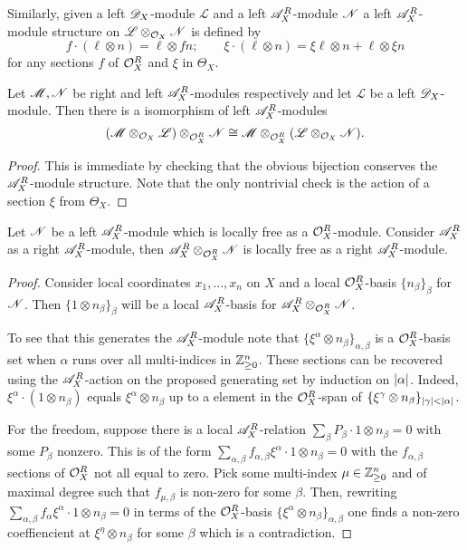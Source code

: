 Similarly, given a left $\mathscr{D}_X$-module $\mathscr{L}$ and a left $\mathscr{A}_X^R$-module $\mathscr{N}$ a left $\mathscr{A}_X^R$-module structure on $\mathscr{L} \otimes_{\mathcal{O}_X} \mathscr{N}$ is defined by
$$f \cdot (\ell\otimes n) =\ell \otimes fn; \qquad \xi \cdot (\ell\otimes n ) = \xi \ell \otimes n + \ell \otimes \xi n$$
for any sections $f$ of $\mathcal{O}_X^R$ and $\xi$ in $\Theta_X$.

\begin{lemma}\label{lem: IsomorphismTensors}
  Let $\mathscr{M}, \mathscr{N}$ be right and left $\mathscr{A}_X^R$-modules respectively and let $\mathscr{L}$ be a left $\mathscr{D}_X$-module. Then there is a isomorphism of left $\mathscr{A}_X^R$-modules
  $$(\mathscr{M} \otimes_{\mathcal{O}_X} \mathscr{L})\otimes_{\mathcal{O}_X^R} \mathscr{N} \cong \mathscr{M} \otimes_{\mathcal{O}_X^R} (\mathscr{L}\otimes_{\mathcal{O}_X} \mathscr{N}).   $$
\end{lemma}
\begin{proof}
  This is immediate by checking that the obvious bijection conserves the $\mathscr{A}_X^R$-module structure. Note that the only nontrivial check is the action of a section $\xi$ from $\Theta_X$.
\end{proof}
\begin{lemma}\label{lem: FreeLeftAModuleTensor}
  Let $\mathscr{N}$ be a left $\mathscr{A}_X^R$-module which is locally free as a $\mathcal{O}_X^R$-module. Consider $\mathscr{A}_X^R$ as a right $\mathscr{A}_X^R$-module, then $\mathscr{A}_X^R \otimes_{\mathcal{O}_X^R} \mathscr{N}$ is locally free as a right $\mathscr{A}_X^R$-module.
\end{lemma}
\begin{proof}
  Consider local coordinates $x_1,\ldots, x_n$ on $X$ and a local $\mathcal{O}_X^R$-basis $\{n_\beta\}_\beta$ for $\mathscr{N}$. Then $\{1\otimes n_\beta\}_{\beta}$ will be a local $\mathscr{A}_X^R$-basis for $\mathscr{A}_X^R \otimes_{\mathcal{O}_X^R} \mathscr{N}$.

  To see that this generates the $\mathscr{A}_X^R$-module note that $\{\xi^\alpha \otimes n_\beta\}_{\alpha,\beta}$
  is a $\mathcal{O}_X^R$-basis set when $\alpha$ runs over all multi-indices in $\mathbb{Z}_{\geq 0}^n$.
  These sections can be recovered using the $\mathscr{A}_X^R$-action on the proposed generating set by induction on $\vert \alpha \vert$.
  Indeed, $\xi^\alpha \cdot (1 \otimes n_\beta)$ equals $\xi^\alpha \otimes n_\beta$ up to a element in the $\mathcal{O}_X^R$-span of $\{\xi^\gamma \otimes n_\beta\}_{\vert \gamma \vert<\vert \alpha \vert}$.

  For the freedom, suppose there is a local $\mathscr{A}_X^R$-relation $\sum_\beta P_\beta \cdot 1\otimes n_\beta = 0$ with some $P_\beta$ nonzero. This is of the form $\sum_{\alpha, \beta} f_{\alpha,\beta} \xi^\alpha \cdot 1\otimes n_\beta = 0$ with the $f_{\alpha,\beta}$ sections of $\mathcal{O}_X^R$ not all equal to zero.
  Pick some multi-index $\mu\in \mathbb{Z}_{\geq 0}^n$ and of maximal degree such that $f_{\mu,\beta}$ is non-zero for some $\beta$.
  Then, rewriting $\sum_{\alpha, \beta} f_\alpha \xi^\alpha \cdot 1\otimes n_\beta = 0$ in terms of the $\mathcal{O}_X^R$-basis $\{\xi^\alpha \otimes n_\beta\}_{\alpha,\beta}$ one finds a non-zero coeffiencient at $\xi^\eta \otimes n_\beta$ for some $\beta$ which is a contradiction.
\end{proof}
